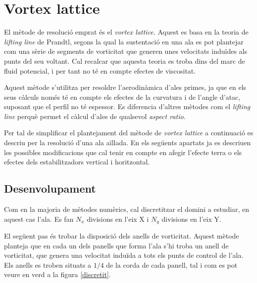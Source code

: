 \chapter{Vortex lattice}

El mètode de resolució emprat és el \textit{vortex lattice}. Aquest es basa en la teoria de \textit{lifting line} de Prandtl, segons la qual la sustentació en una ala es pot plantejar com una sèrie de segments de vorticitat que generen unes velocitats induïdes als punts del seu voltant. Cal recalcar que aquesta teoria es troba dins del marc de fluid potencial, i per tant no té en compte efectes de viscositat.

Aquest mètode s'utilitza per resoldre l'aerodinàmica d'ales primes, ja que en els seus càlculs només té en compte els efectes de la curvatura i de l'angle d'atac, suposant que el perfil no té espessor. Es diferencia d'altres mètodes com el \textit{lifting line} perquè permet el càlcul d'ales de qualsevol \textit{aspect ratio}.

Per tal de simplificar el plantejament del mètode de \textit{vortex lattice} a continuació es descriu per la resolució d'una ala aïllada. En els següents apartats ja es descriuen les possibles modificacions que cal tenir en compte en afegir l'efecte terra o els efectes dels estabilitzadors vertical i horitzontal.

\section{Desenvolupament}

Com en la majoria de mètodes numèrics, cal discretitzar el domini a estudiar, en aquest cas l'ala. Es fan $N_{x}$ divisions en l'eix X i $N_{y}$ divisions en l'eix Y.

El següent pas és trobar la disposició dels anells de vorticitat. Aquest mètode planteja que en cada un dels panells que forma l'ala s'hi troba un anell de vorticitat, que genera una velocitat induïda a tots els punts de control de l'ala. Els anells es troben situats a $1/4$ de la corda de cada panell, tal i com es pot veure en verd a la figura \ref{discretit}.

